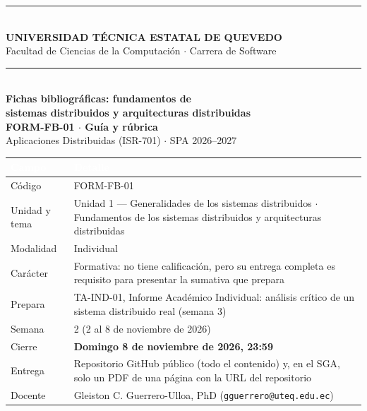 \documentclass[11pt,a4paper]{article}
\newcommand{\hdr}[1]{\textcolor{white}{\textbf{#1}}}
\begin{document}
\begin{center}
	{\color{uteqBlue}\rule{\linewidth}{1pt}}\\[0.2cm]
	{\large\bfseries\color{uteqBlue} UNIVERSIDAD TÉCNICA ESTATAL DE QUEVEDO}\\[0.05cm]
	{\normalsize Facultad de Ciencias de la Computación $\cdot$ Carrera de Software}\\[0.1cm]
	{\color{uteqBlue}\rule{\linewidth}{1pt}}\\[0.35cm]
	{\LARGE\bfseries\color{uteqBlue} Fichas bibliográficas: fundamentos de}\\[0.1cm]
	{\LARGE\bfseries\color{uteqBlue} sistemas distribuidos y arquitecturas distribuidas}\\[0.15cm]
	{\large\bfseries FORM-FB-01 $\cdot$ Guía y rúbrica}\\[0.1cm]
	{\normalsize Aplicaciones Distribuidas (ISR-701) $\cdot$ SPA 2026--2027}
\end{center}

\vspace{0.2cm}

\begin{xltabular}{\linewidth}{@{}L{4.6cm}Y@{}}
	\toprule
	\hdr{Campo} & \hdr{Detalle} \\
	\midrule
	\endhead
	Código & FORM-FB-01 \\
	Unidad y tema & Unidad 1 --- Generalidades de los sistemas distribuidos $\cdot$ Fundamentos de los sistemas distribuidos y arquitecturas distribuidas \\
	Modalidad & Individual \\
	Carácter & Formativa: no tiene calificación, pero su entrega completa es requisito para presentar la sumativa que prepara \\
	Prepara & TA-IND-01, Informe Académico Individual: análisis crítico de un sistema distribuido real (semana 3) \\
	Semana & 2 (2 al 8 de noviembre de 2026) \\
	Cierre & \textbf{Domingo 8 de noviembre de 2026, 23:59} \\
	Entrega & Repositorio GitHub público (todo el contenido) y, en el SGA, solo un PDF de una página con la URL del repositorio \\
	Docente & Gleiston C. Guerrero-Ulloa, PhD (\texttt{gguerrero@uteq.edu.ec}) \\
	\bottomrule
\end{xltabular}
\end{document}
